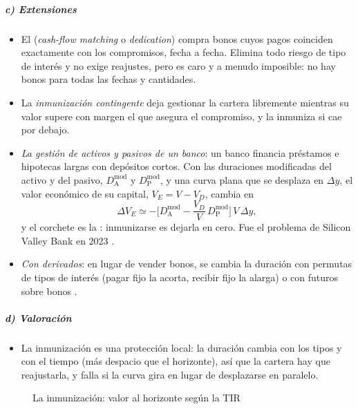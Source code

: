 \documentclass[11pt]{article}
\begin{document}
\subparagraph{c) Extensiones}
\begin{itemize}
\item El  (\emph{cash-flow matching} o \emph{dedication}) compra bonos cuyos pagos coinciden exactamente con los compromisos, fecha a fecha. Elimina todo riesgo de tipo de interés y no exige reajustes, pero es caro y a menudo imposible: no hay bonos para todas las fechas y cantidades.
\item La \emph{inmunización contingente}\nocite{LeibowitzWeinberger1982Contingent} deja gestionar la cartera libremente mientras su valor supere con margen el que asegura el compromiso, y la inmuniza si cae por debajo.
\item \emph{La gestión de activos y pasivos de un banco}: un banco financia préstamos e hipotecas largas con depósitos cortos. Con las duraciones modificadas del activo y del pasivo, $D^{\mathrm{mod}}_{\mathrm A}$ y $D^{\mathrm{mod}}_{\mathrm P}$, y una curva plana que se desplaza en $\Delta y$, el valor económico de su capital, $V_E=V-V_D$, cambia en
  \begin{equation}\label{eq:brecha-duracion}
  \Delta V_E\simeq-\Big[D^{\mathrm{mod}}_{\mathrm A}-\frac{V_D}{V}\,D^{\mathrm{mod}}_{\mathrm P}\Big]\,V\,\Delta y ,
  \end{equation}
  y el corchete es la : inmunizarse es dejarla en cero. Fue el problema de Silicon Valley Bank en 2023  .
\item \emph{Con derivados}: en lugar de vender bonos, se cambia la duración con permutas de tipos de interés (pagar fijo la acorta, recibir fijo la alarga) o con futuros sobre bonos .
\end{itemize}

\subparagraph{d) Valoración}
\begin{itemize}
\item La inmunización es una protección local: la duración cambia con los tipos y con el tiempo (más despacio que el horizonte), así que la cartera hay que reajustarla, y falla si la curva gira en lugar de desplazarse en paralelo.
\end{itemize}

\begin{figure}[H]
\centering
\caption{La inmunización: valor al horizonte según la TIR}\label{fig:inmunizacion-horizonte}
\end{figure}
\end{document}
